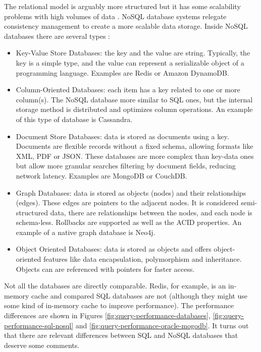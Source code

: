 \documentclass[12pt,english]{article} %
\begin{document}
The relational model is arguably more structured but it has some scalability problems with high volumes of data \cite{type-of-nosql-databases}.
NoSQL database systems relegate consistency management to create a more scalable data storage.
Inside NoSQL databases there are several types \cite{type-of-nosql-databases}:
\begin{itemize}
    \item Key-Value Store Databases: the key and the value are string.
    Typically, the key is a simple type, and the value can represent a serializable object of a programming language.
    Examples are Redis or Amazon DynamoDB.
    \item Column-Oriented Databases: each item has a key related to one or more column(s).
    The NoSQL database more similar to SQL ones, but the internal storage method is distributed and optimizes column operations.
    An example of this type of database is Cassandra.
    \item Document Store Databases: data is stored as documents using a key.
    Documents are flexible records without a fixed schema, allowing formats like XML, PDF or JSON.
    These databases are more complex than key-data ones but allow more granular searches filtering by document fields, reducing network latency.
    Examples are MongoDB or CouchDB.
    \item Graph Databases: data is stored as objects (nodes) and their relationships (edges).
    These edges are pointers to the adjacent nodes.
    It is considered semi-structured data, there are relationships between the nodes, and each node is schema-less.
    Rollbacks are supported as well as the ACID properties.
    An example of a native graph database is Neo4j.
    \item Object Oriented Databases: data is stored as objects and offers object-oriented features like data encapsulation, polymorphism and inheritance.
    Objects can are referenced with pointers for faster access.
\end{itemize}

Not all the databases are directly comparable.
Redis, for example, is an in-memory cache and compared SQL databases are not (although they might use some kind of in-memory cache to improve performance).
The performance differences are shown in Figures \ref{fig:query-performance-databases}, \ref{fig:query-performance-sql-nosql} and \ref{fig:query-performance-oracle-mogodb}.
It turns out that there are relevant differences between SQL and NoSQL databases that deserve some comments.
\end{document}
